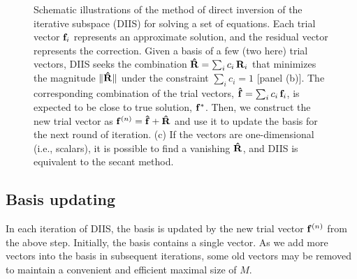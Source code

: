 \documentclass[reprint,aip,jcp,superscriptaddress]{revtex4-1}
\begin{document}
\begin{figure}[h]
  \caption{\label{fig:scheme}
    Schematic illustrations of the method of
    direct inversion of the iterative subspace (DIIS)
    for solving a set of equations.
    Each trial vector $\mathbf{f}_i$
    represents an approximate solution,
    and the residual vector
    represents the correction.
    Given a basis of a few (two here) trial vectors,
    DIIS seeks the combination
    $\mathbf{\hat R} = \sum_i c_i \, \mathbf{R}_i$
    that minimizes the magnitude
    $\| \mathbf{\hat R} \|$
    under the constraint
    $\sum_i c_i = 1$ [panel (b)].
    The corresponding combination
    of the trial vectors,
    $\mathbf{\hat f} = \sum_i c_i \, \mathbf{f}_i$,
    is expected to be close to true solution, $\mathbf{f}^*$.
    Then,
    we construct
    the new trial vector as
    $\mathbf{f}^{(n)} = \mathbf{\hat f} + \mathbf{\hat R}$
    and use it to update the basis
    for the next round of iteration.
    (c) If the vectors are one-dimensional (i.e., scalars),
    it is possible to find a vanishing $\mathbf{\hat R}$, and
    DIIS is equivalent to the secant method.
  }
\end{figure}




\subsection{\label{sec:basis_updating}Basis updating}



In each iteration of DIIS,
the basis is updated
by the new trial vector $\mathbf{f}^{(n)}$
from the above step.
%
Initially,
the basis contains a single vector.
%
As we add more vectors into the basis in subsequent iterations,
some old vectors may be removed
to maintain a convenient and efficient maximal size of $M$.
\end{document}
